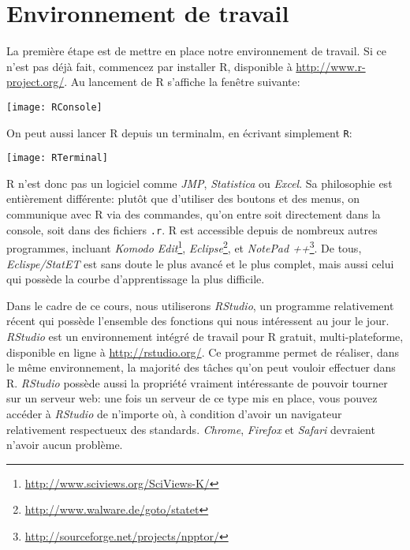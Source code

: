 \section{Environnement de travail}

La première étape est de mettre en place notre environnement de travail.
Si ce n'est pas déjà fait, commencez par installer R, disponible à \url{http://www.r-project.org/}.
Au lancement de R s'affiche la fenêtre suivante:  

\begin{center}
\texttt{[image: RConsole]}
\end{center}

\noindent On peut aussi lancer R depuis un terminalm, en écrivant simplement \texttt{R}:

\begin{center}
\texttt{[image: RTerminal]}
\end{center}

R n'est donc pas un logiciel comme \emph{JMP}, \emph{Statistica} ou \emph{Excel}.
Sa philosophie est entièrement différente: plutôt que d'utiliser des boutons et des menus, on communique avec R via des commandes, qu'on entre soit directement dans la console, soit dans des fichiers \texttt{.r}.
R est accessible depuis de nombreux autres programmes, incluant \emph{Komodo Edit}\footnote{\url{http://www.sciviews.org/SciViews-K/}}, \emph{Eclipse}\footnote{\url{http://www.walware.de/goto/statet}}, et \emph{NotePad ++}\footnote{\url{http://sourceforge.net/projects/npptor/}}.
De tous, \emph{Eclispe/StatET} est sans doute le plus avancé et le plus complet, mais aussi celui qui possède la courbe d'apprentissage la plus difficile. 

Dans le cadre de ce cours, nous utiliserons \emph{RStudio}, un programme relativement récent qui possède l'ensemble des fonctions qui nous intéressent au jour le jour.
\emph{RStudio} est un environnement intégré de travail pour R gratuit, multi-plateforme, disponible en ligne à \url{http://rstudio.org/}.
Ce programme permet de réaliser, dans le même environnement, la majorité des tâches qu'on peut vouloir effectuer dans R.
\emph{RStudio} possède aussi la propriété vraiment intéressante de pouvoir tourner sur un serveur web:
une fois un serveur de ce type mis en place, vous pouvez accéder à \emph{RStudio} de n'importe où, à condition d'avoir un navigateur relativement respectueux des standards.
\emph{Chrome}, \emph{Firefox} et \emph{Safari} devraient n'avoir aucun problème. 

